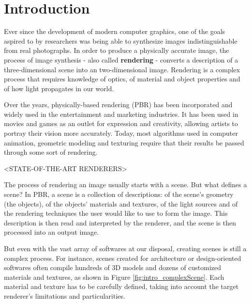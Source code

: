 \documentclass[cic,tc,english]{iiufrgs}
\begin{document}

\tableofcontents

\chapter{Introduction}
Ever since the development of modern computer graphics, one of the goals aspired to by researchers was being able to synthesize images indistinguishable from real photographs. 
In order to produce a physically accurate image, the process of image synthesis - also called \textbf{rendering} - converts a description of a three-dimensional scene into an two-dimensional image.
Rendering is a complex process that requires knowledge of optics, of material and object properties and of how light propagates in our world. 

Over the years, physically-based rendering (PBR) has been incorporated and widely used in the entertainment and marketing industries. It has been used in movies and games as an outlet for expression and creativity,
allowing artists to portray their vision more accurately. Today, most algorithms used in computer animation, geometric modeling and texturing require that their results be passed through 
some sort of rendering. 

<STATE-OF-THE-ART RENDERERS>

The process of rendering an image usually starts with a scene. But what defines a scene? In PBR, a scene is a collection of descriptions: of the scene's geometry (the objects), of the objects' materials and textures, 
of the light sources and of the rendering techniques the user would like to use to form the image. This description is then read and interpreted by the renderer, and the scene is then processed into an output image.

But even with the vast array of softwares at our disposal, creating scenes is still a complex process. For instance, scenes created for architecture or design-oriented softwares often compile hundreds of 
3D models and dozens of customized materials and textures, as shown in Figure \ref{fig:intro_complexScene}. Each material and texture has to be carefully defined, taking into account the target 
renderer's limitations and particularities. %
\end{document}
